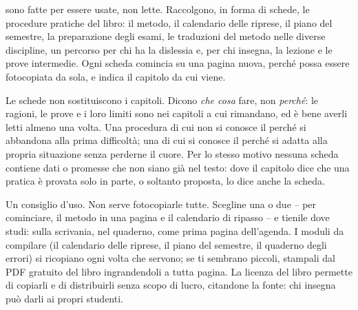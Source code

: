 \newcommand{\scheda}[2]{\clearpage\normalsize\section{#1}\label{#2}\small}
\newcommand{\dacapitolo}[1]{%
  {\centering\footnotesize\itshape #1\par}\vspace{\baselineskip}}
\newcommand{\casella}{\tikz[baseline=-0.05em]\draw[line width=0.4pt]
  (0,0) rectangle (0.62em,0.62em);}
\newcommand{\vuota}{\rule{0pt}{1.45\baselineskip}}
\newcommand{\modulo}[1]{%
  \clearpage\normalsize
  {\centering{\color{rubrica}\scshape\spaziato[120]{\MakeLowercase{#1}}}\par}%
  \vspace{0.5\baselineskip}\small}
\newenvironment{controlli}
  {\begin{itemize}[label=\casella, leftmargin=1.6em, itemsep=0pt, topsep=0.2\baselineskip]}
  {\end{itemize}}
\raggedbottom

 sono fatte per essere usate, non lette.
Raccolgono, in forma di schede, le procedure pratiche del libro: il
metodo, il calendario delle riprese, il piano del semestre, la
preparazione degli esami, le traduzioni del metodo nelle diverse
discipline, un percorso per chi ha la dislessia e, per chi insegna, la
lezione e le prove intermedie. Ogni scheda comincia su una pagina
nuova, perché possa essere fotocopiata da sola, e indica il capitolo da
cui viene.

Le schede non sostituiscono i capitoli. Dicono \emph{che cosa} fare, non
\emph{perché}: le ragioni, le prove e i loro limiti sono nei capitoli a
cui rimandano, ed è bene averli letti almeno una volta. Una procedura
di cui non si conosce il perché si abbandona alla prima difficoltà; una
di cui si conosce il perché si adatta alla propria situazione senza
perderne il cuore. Per lo stesso motivo nessuna scheda contiene dati o
promesse che non siano già nel testo: dove il capitolo dice che una
pratica è provata solo in parte, o soltanto proposta, lo dice anche la
scheda.

Un consiglio d'uso. Non serve fotocopiarle tutte. Scegline una o due --
per cominciare, il metodo in una pagina e il calendario di ripasso -- e
tienile dove studi: sulla scrivania, nel quaderno, come prima pagina
dell'agenda. I moduli da compilare (il calendario delle riprese, il
piano del semestre, il quaderno degli errori) si ricopiano ogni volta
che servono; se ti sembrano piccoli, stampali dal PDF gratuito del
libro ingrandendoli a tutta pagina. La licenza del libro permette di
copiarli e di distribuirli senza scopo di lucro, citandone la fonte:
chi insegna può darli ai propri studenti.

